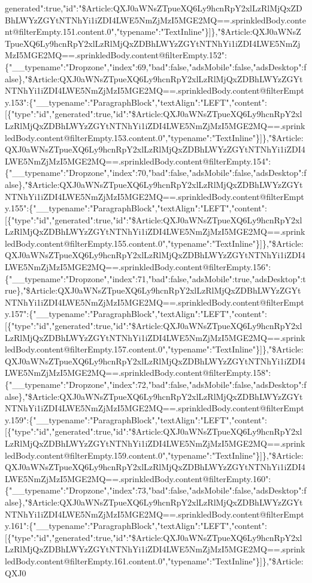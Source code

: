 generated":true,"id":"\$Article:QXJ0aWNsZTpueXQ6Ly9hcnRpY2xlLzRlMjQxZDBhLWYzZGYtNTNhYi1iZDI4LWE5NmZjMzI5MGE2MQ==.sprinkledBody.content@filterEmpty.151.content.0","typename":"TextInline"\}{]}\},"\$Article:QXJ0aWNsZTpueXQ6Ly9hcnRpY2xlLzRlMjQxZDBhLWYzZGYtNTNhYi1iZDI4LWE5NmZjMzI5MGE2MQ==.sprinkledBody.content@filterEmpty.152":\{"\_\_typename":"Dropzone","index":69,"bad":false,"adsMobile":false,"adsDesktop":false\},"\$Article:QXJ0aWNsZTpueXQ6Ly9hcnRpY2xlLzRlMjQxZDBhLWYzZGYtNTNhYi1iZDI4LWE5NmZjMzI5MGE2MQ==.sprinkledBody.content@filterEmpty.153":\{"\_\_typename":"ParagraphBlock","textAlign":"LEFT","content":{[}\{"type":"id","generated":true,"id":"\$Article:QXJ0aWNsZTpueXQ6Ly9hcnRpY2xlLzRlMjQxZDBhLWYzZGYtNTNhYi1iZDI4LWE5NmZjMzI5MGE2MQ==.sprinkledBody.content@filterEmpty.153.content.0","typename":"TextInline"\}{]}\},"\$Article:QXJ0aWNsZTpueXQ6Ly9hcnRpY2xlLzRlMjQxZDBhLWYzZGYtNTNhYi1iZDI4LWE5NmZjMzI5MGE2MQ==.sprinkledBody.content@filterEmpty.154":\{"\_\_typename":"Dropzone","index":70,"bad":false,"adsMobile":false,"adsDesktop":false\},"\$Article:QXJ0aWNsZTpueXQ6Ly9hcnRpY2xlLzRlMjQxZDBhLWYzZGYtNTNhYi1iZDI4LWE5NmZjMzI5MGE2MQ==.sprinkledBody.content@filterEmpty.155":\{"\_\_typename":"ParagraphBlock","textAlign":"LEFT","content":{[}\{"type":"id","generated":true,"id":"\$Article:QXJ0aWNsZTpueXQ6Ly9hcnRpY2xlLzRlMjQxZDBhLWYzZGYtNTNhYi1iZDI4LWE5NmZjMzI5MGE2MQ==.sprinkledBody.content@filterEmpty.155.content.0","typename":"TextInline"\}{]}\},"\$Article:QXJ0aWNsZTpueXQ6Ly9hcnRpY2xlLzRlMjQxZDBhLWYzZGYtNTNhYi1iZDI4LWE5NmZjMzI5MGE2MQ==.sprinkledBody.content@filterEmpty.156":\{"\_\_typename":"Dropzone","index":71,"bad":false,"adsMobile":true,"adsDesktop":true\},"\$Article:QXJ0aWNsZTpueXQ6Ly9hcnRpY2xlLzRlMjQxZDBhLWYzZGYtNTNhYi1iZDI4LWE5NmZjMzI5MGE2MQ==.sprinkledBody.content@filterEmpty.157":\{"\_\_typename":"ParagraphBlock","textAlign":"LEFT","content":{[}\{"type":"id","generated":true,"id":"\$Article:QXJ0aWNsZTpueXQ6Ly9hcnRpY2xlLzRlMjQxZDBhLWYzZGYtNTNhYi1iZDI4LWE5NmZjMzI5MGE2MQ==.sprinkledBody.content@filterEmpty.157.content.0","typename":"TextInline"\}{]}\},"\$Article:QXJ0aWNsZTpueXQ6Ly9hcnRpY2xlLzRlMjQxZDBhLWYzZGYtNTNhYi1iZDI4LWE5NmZjMzI5MGE2MQ==.sprinkledBody.content@filterEmpty.158":\{"\_\_typename":"Dropzone","index":72,"bad":false,"adsMobile":false,"adsDesktop":false\},"\$Article:QXJ0aWNsZTpueXQ6Ly9hcnRpY2xlLzRlMjQxZDBhLWYzZGYtNTNhYi1iZDI4LWE5NmZjMzI5MGE2MQ==.sprinkledBody.content@filterEmpty.159":\{"\_\_typename":"ParagraphBlock","textAlign":"LEFT","content":{[}\{"type":"id","generated":true,"id":"\$Article:QXJ0aWNsZTpueXQ6Ly9hcnRpY2xlLzRlMjQxZDBhLWYzZGYtNTNhYi1iZDI4LWE5NmZjMzI5MGE2MQ==.sprinkledBody.content@filterEmpty.159.content.0","typename":"TextInline"\}{]}\},"\$Article:QXJ0aWNsZTpueXQ6Ly9hcnRpY2xlLzRlMjQxZDBhLWYzZGYtNTNhYi1iZDI4LWE5NmZjMzI5MGE2MQ==.sprinkledBody.content@filterEmpty.160":\{"\_\_typename":"Dropzone","index":73,"bad":false,"adsMobile":false,"adsDesktop":false\},"\$Article:QXJ0aWNsZTpueXQ6Ly9hcnRpY2xlLzRlMjQxZDBhLWYzZGYtNTNhYi1iZDI4LWE5NmZjMzI5MGE2MQ==.sprinkledBody.content@filterEmpty.161":\{"\_\_typename":"ParagraphBlock","textAlign":"LEFT","content":{[}\{"type":"id","generated":true,"id":"\$Article:QXJ0aWNsZTpueXQ6Ly9hcnRpY2xlLzRlMjQxZDBhLWYzZGYtNTNhYi1iZDI4LWE5NmZjMzI5MGE2MQ==.sprinkledBody.content@filterEmpty.161.content.0","typename":"TextInline"\}{]}\},"\$Article:QXJ0